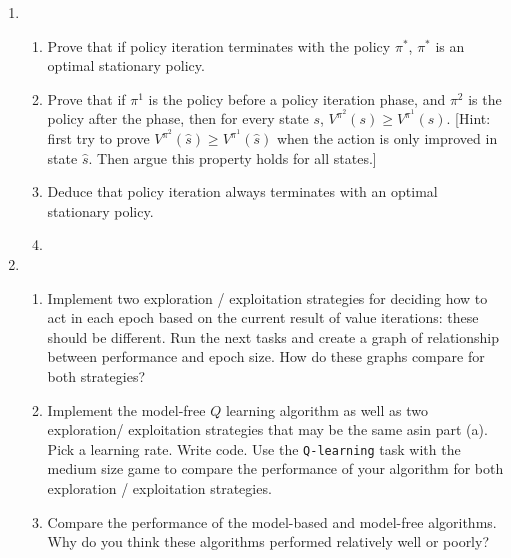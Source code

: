 \documentclass{article}
\begin{document}
\begin{enumerate}
\item 
  \begin{enumerate}
  \item {Prove that if policy iteration terminates with the policy
  $\pi^*$, $\pi^*$ is an optimal stationary policy.}

  \item {Prove that if $\pi^1$ is the policy before a policy iteration
  phase, and $\pi^2$ is the policy after the phase, then for every state $s$,
  $V^{\pi^2}(s)\geq V^{\pi^1}(s)$. [Hint: first try to prove $V^{\pi^2}(\hat s)\geq V^{\pi^1}(\hat s)$
  when the action is only improved in state $\hat s$. Then argue this property
  holds for all states.]}

  \item {Deduce that policy iteration always terminates with an
  optimal stationary policy.}

  \item 

  \end{enumerate}

\item 
  \begin{enumerate}
  \item {Implement two exploration / exploitation strategies for deciding how to act
  in each epoch based on the current result of value iterations: these should be different.
  Run the next tasks and create a graph of relationship between performance and epoch
  size. How do these graphs compare for both strategies?}

  \item {Implement the model-free $Q$ learning algorithm as well as two exploration/
  exploitation strategies that may be the same asin part (a). Pick a learning rate. Write 
  code. Use the \texttt{Q-learning} task with the medium size game to compare the 
  performance of your algorithm for both exploration / exploitation strategies.}

  \item {Compare the performance of the model-based and model-free algorithms. Why 
  do you think these algorithms performed relatively well or poorly?}


  \end{enumerate}

\end{enumerate}
\end{document}
